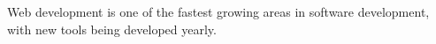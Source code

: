 Web development is one of the fastest growing areas in software development, with new tools being developed yearly. 







